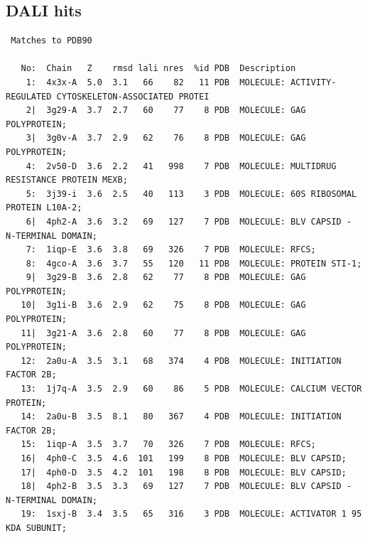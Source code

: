 \documentclass{bmcart}
\begin{document}
\subsection*{DALI hits}

\begin{verbatim}
 Matches to PDB90
 
   No:  Chain   Z    rmsd lali nres  %id PDB  Description
    1:  4x3x-A  5.0  3.1   66    82   11 PDB  MOLECULE: ACTIVITY-REGULATED CYTOSKELETON-ASSOCIATED PROTEI          
    2|  3g29-A  3.7  2.7   60    77    8 PDB  MOLECULE: GAG POLYPROTEIN;                                           
    3|  3g0v-A  3.7  2.9   62    76    8 PDB  MOLECULE: GAG POLYPROTEIN;                                           
    4:  2v50-D  3.6  2.2   41   998    7 PDB  MOLECULE: MULTIDRUG RESISTANCE PROTEIN MEXB;                         
    5:  3j39-i  3.6  2.5   40   113    3 PDB  MOLECULE: 60S RIBOSOMAL PROTEIN L10A-2;                              
    6|  4ph2-A  3.6  3.2   69   127    7 PDB  MOLECULE: BLV CAPSID - N-TERMINAL DOMAIN;                            
    7:  1iqp-E  3.6  3.8   69   326    7 PDB  MOLECULE: RFCS;                                                      
    8:  4gco-A  3.6  3.7   55   120   11 PDB  MOLECULE: PROTEIN STI-1;                                             
    9|  3g29-B  3.6  2.8   62    77    8 PDB  MOLECULE: GAG POLYPROTEIN;                                           
   10|  3g1i-B  3.6  2.9   62    75    8 PDB  MOLECULE: GAG POLYPROTEIN;                                           
   11|  3g21-A  3.6  2.8   60    77    8 PDB  MOLECULE: GAG POLYPROTEIN;                                           
   12:  2a0u-A  3.5  3.1   68   374    4 PDB  MOLECULE: INITIATION FACTOR 2B;                                      
   13:  1j7q-A  3.5  2.9   60    86    5 PDB  MOLECULE: CALCIUM VECTOR PROTEIN;                                    
   14:  2a0u-B  3.5  8.1   80   367    4 PDB  MOLECULE: INITIATION FACTOR 2B;                                      
   15:  1iqp-A  3.5  3.7   70   326    7 PDB  MOLECULE: RFCS;                                                      
   16|  4ph0-C  3.5  4.6  101   199    8 PDB  MOLECULE: BLV CAPSID;                                                
   17|  4ph0-D  3.5  4.2  101   198    8 PDB  MOLECULE: BLV CAPSID;                                                
   18|  4ph2-B  3.5  3.3   69   127    7 PDB  MOLECULE: BLV CAPSID - N-TERMINAL DOMAIN;                            
   19:  1sxj-B  3.4  3.5   65   316    3 PDB  MOLECULE: ACTIVATOR 1 95 KDA SUBUNIT;                                

\end{verbatim}
\end{document}
